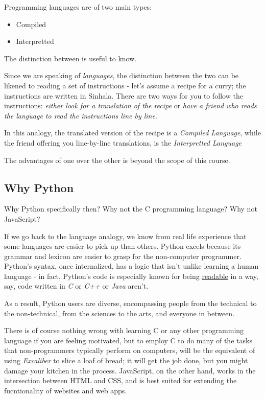 \documentclass[11pt]{article}
\begin{document}
Programming languages are of two main types:
\begin{itemize}
\item Compiled
\item Interpretted
\end{itemize}

The distinction between is useful to know.

Since we are speaking of \emph{languages}, the distinction between the two can be likened to reading a set of instructions - let's assume a recipe for a curry; the instructions are written in Sinhala. There are two ways for you to follow the instructions: \emph{either look for a translation of the recipe} or \emph{have a friend who reads the language to read the instructions line by line}.

In this analogy, the translated version of the recipe is a \emph{Compiled Language}, while the friend offering you line-by-line translations, is the \emph{Interpretted Language}

The advantages of one over the other is beyond the scope of this course.

\subsection{Why Python}
\label{sec:orgdac161c}
Why Python specifically then? Why not the C programming language? Why not JavaScript?

If we go back to the language analogy, we know from real life experience that some languages are easier to pick up than others. Python excels because its grammar and lexicon are easier to grasp for the non-computer programmer. Python's syntax, once internalized, has a logic that isn't unlike learning a human language - in fact, Python's code is especially known for being \uline{readable} in a way, say, code written in \emph{C} or \emph{C++} or \emph{Java} aren't.

As a result, Python users are diverse, encompassing people from the technical to the non-technical, from the sciences to the arts, and everyone in between.

There is of course nothing wrong with learning C or any other programming language if you are feeling motivated, but to employ C to do many of the tasks that non-programmers typically perform on computers, will be the equivalent of using \emph{Excaliber} to slice a loaf of bread; it will get the job done, but you might damage your kitchen in the process. JavaScript, on the other hand, works in the intersection between HTML and CSS, and is best suited for extending the fucntionality of websites and web apps.
\end{document}
